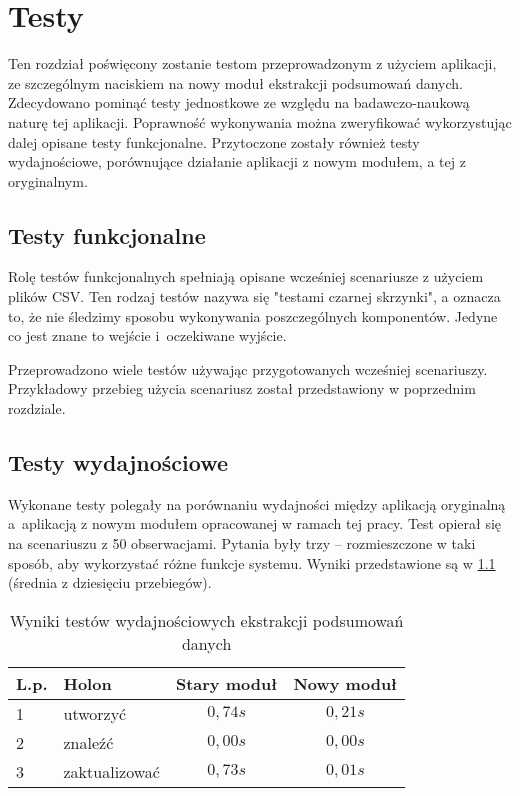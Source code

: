 \chapter{Testy}

Ten rozdział poświęcony zostanie testom przeprowadzonym z użyciem aplikacji, ze szczególnym naciskiem na nowy moduł ekstrakcji podsumowań danych. Zdecydowano pominąć testy jednostkowe ze względu na badawczo-naukową naturę tej aplikacji. Poprawność wykonywania można zweryfikować wykorzystując dalej opisane testy funkcjonalne. Przytoczone zostały również testy wydajnościowe, porównujące działanie aplikacji z nowym modułem, a tej z oryginalnym.


\section{Testy funkcjonalne}

Rolę testów funkcjonalnych spełniają opisane wcześniej scenariusze z użyciem plików CSV. Ten rodzaj testów nazywa się "testami czarnej skrzynki", a oznacza to, że nie śledzimy sposobu wykonywania poszczególnych komponentów. Jedyne co jest znane to wejście i~oczekiwane wyjście.

Przeprowadzono wiele testów używając przygotowanych wcześniej scenariuszy. Przykładowy przebieg użycia scenariusz został przedstawiony w poprzednim rozdziale.


\section{Testy wydajnościowe}

Wykonane testy polegały na porównaniu wydajności między aplikacją oryginalną a~aplikacją z nowym modułem opracowanej w ramach tej pracy. Test opierał się na scenariuszu z 50 obserwacjami. Pytania były trzy -- rozmieszczone w taki sposób, aby wykorzystać różne funkcje systemu. Wyniki przedstawione są w \ref{tab:testy} (średnia z dziesięciu przebiegów).

\begin{table}[H]
	\caption{Wyniki testów wydajnościowych ekstrakcji podsumowań danych}
	\label{tab:testy}
	\centering
	\begin{tabular}{|l|l|c|c|} \hline
		\textbf{L.p.} & \textbf{Holon} & \textbf{Stary moduł} & \textbf{Nowy moduł} \\ \hline
		1  &  utworzyć  &  $ 0,74s $  &  $ 0,21s $  \\ \hline
		2  &  znaleźć  &  $ 0,00s $  &  $ 0,00s $  \\ \hline
		3  &  zaktualizować  &  $ 0,73s $  &  $ 0,01s $  \\ \hline
	\end{tabular}
\end{table}

